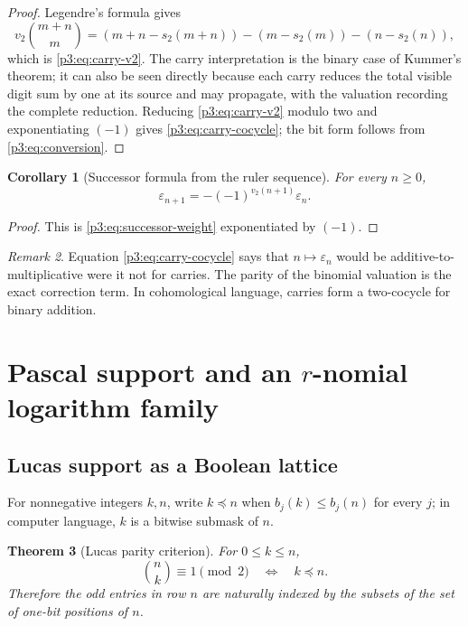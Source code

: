 \documentclass[11pt,oneside]{article}
\newtheorem{theorem}{Theorem}[section]
\newtheorem{corollary}[theorem]{Corollary}
\theoremstyle{definition}
\theoremstyle{remark}
\newtheorem{remark}[theorem]{Remark}
\newcommand{\swt}{s_2}
\newcommand{\vtwo}{v_2}
\newcommand{\eps}{\varepsilon}
\newcommand{\submask}{\preccurlyeq}
\newcommand{\1}{\mathbf 1}
\begin{document}
\begin{proof}
Legendre's formula gives
\[
 \vtwo\binom{m+n}{m}
 =(m+n-\swt(m+n))-(m-\swt(m))-(n-\swt(n)),
\]
which is \eqref{p3:eq:carry-v2}.  The carry interpretation is the binary case of Kummer's
theorem; it can also be seen directly because each carry reduces the total visible digit sum
by one at its source and may propagate, with the valuation recording the complete reduction.
Reducing \eqref{p3:eq:carry-v2} modulo two and exponentiating \((-1)\) gives
\eqref{p3:eq:carry-cocycle}; the bit form follows from \eqref{p3:eq:conversion}.
\end{proof}

\begin{corollary}[Successor formula from the ruler sequence]
\label{p3:cor:successor-sign}
For every \(n\ge0\),
\begin{equation}
 \boxed{\eps_{n+1}=-(-1)^{\vtwo(n+1)}\eps_n.}
 \label{p3:eq:successor-sign}
\end{equation}
\end{corollary}

\begin{proof}
This is \eqref{p3:eq:successor-weight} exponentiated by \((-1)\).
\end{proof}

\begin{remark}
Equation \eqref{p3:eq:carry-cocycle} says that \(n\mapsto\eps_n\) would be additive-to-
multiplicative were it not for carries.  The parity of the binomial valuation is the exact
correction term.  In cohomological language, carries form a two-cocycle for binary addition.
\end{remark}

\section{Pascal support and an \texorpdfstring{\(r\)}{r}-nomial logarithm family}
\label{p3:sec:pascal}

\subsection{Lucas support as a Boolean lattice}

For nonnegative integers \(k,n\), write \(k\submask n\) when
\(b_j(k)\le b_j(n)\) for every \(j\); in computer language, \(k\) is a bitwise submask of
\(n\).

\begin{theorem}[Lucas parity criterion]
\label{p3:thm:lucas-parity}
For \(0\le k\le n\),
\begin{equation}
 \binom nk\equiv1\pmod2
 \quad\Longleftrightarrow\quad
 k\submask n.
 \label{p3:eq:lucas-submask}
\end{equation}
Therefore the odd entries in row \(n\) are naturally indexed by the subsets of the set of
one-bit positions of \(n\).
\end{theorem}
\end{document}
